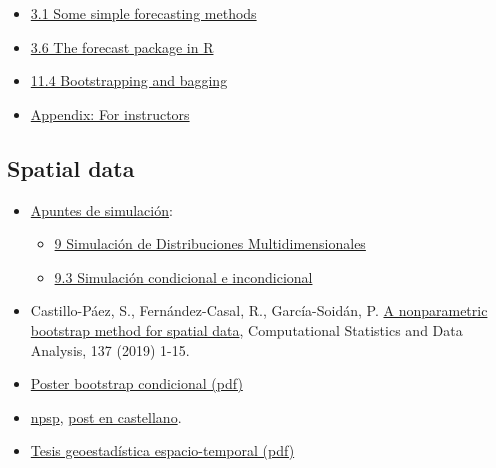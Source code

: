 \documentclass[]{book}
\theoremstyle{definition}
\theoremstyle{definition}
\theoremstyle{definition}
\theoremstyle{remark}
\begin{document}
\begin{itemize}
\item
  \href{https://otexts.com/fpp2/simple-methods.html}{3.1 Some simple
  forecasting methods}
\item
  \href{https://otexts.com/fpp2/the-forecast-package-in-r.html}{3.6 The
  forecast package in R}
\item
  \href{https://otexts.com/fpp2/bootstrap.html}{11.4 Bootstrapping and
  bagging}
\item
  \href{https://otexts.com/fpp2/appendix-for-instructors.html}{Appendix:
  For instructors}
\end{itemize}

\subsection{Spatial data}\label{spatial-links}

\begin{itemize}
\item
  \href{https://rubenfcasal.github.io/simbook}{Apuntes de simulación}:

  \begin{itemize}
  \item
    \href{https://rubenfcasal.github.io/simbook/simulacion-de-distribuciones-multidimensionales.html}{9
    Simulación de Distribuciones Multidimensionales}
  \item
    \href{https://rubenfcasal.github.io/simbook/simulacion-de-distribuciones-multidimensionales.html\#simulacion-condicional-e-incondicional}{9.3
    Simulación condicional e incondicional}
  \end{itemize}
\item
  Castillo-Páez, S., Fernández-Casal, R., García-Soidán, P.
  \href{https://www.sciencedirect.com/science/article/pii/S0167947319300325?via\%3Dihub}{A
  nonparametric bootstrap method for spatial data}, Computational
  Statistics and Data Analysis, 137 (2019) 1-15.
\item
  \href{./Poster_METMA9_2.pdf}{Poster bootstrap condicional (pdf)}
\item
  \href{https://rubenfcasal.github.io/npsp/index.html}{npsp},
  \href{https://rubenfcasal.github.io/post/geoestadistica-no-parametrica-con-el-paquete-npsp/}{post
  en castellano}.
\item
  \href{https://rubenfcasal.github.io/Geoestadistica_espacio-temporal.pdf}{Tesis
  geoestadística espacio-temporal (pdf)}
\end{itemize}


\end{document}
